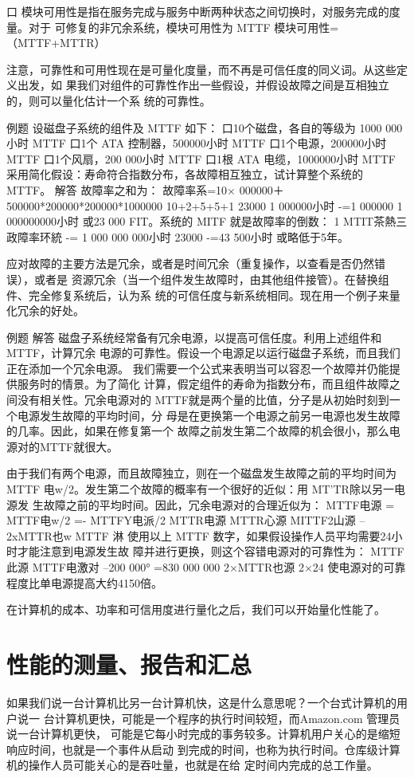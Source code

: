口 模块可用性是指在服务完成与服务中断两种状态之间切换时，对服务完成的度量。对于
可修复的非冗余系统，模块可用性为
MTTF
模块可用性=（MTTF+MTTR）

注意，可靠性和可用性现在是可量化度量，而不再是可信任度的同义词。从这些定义出发，如
果我们对组件的可靠性作出一些假设，并假设故障之间是互相独立的，则可以量化估计一个系
统的可靠性。

例题
设磁盘子系统的组件及 MTTF 如下：
口10个磁盘，各自的等级为 1000 000小时 MTTF
口1个 ATA 控制器，500000小时 MTTF
口1个电源，200000小时 MTTF
口1个风扇，200 000小时 MTTF
口1根 ATA 电缆，1000000小时 MTTF
采用简化假设：寿命符合指数分布，各故障相互独立，试计算整个系统的 MTTF。
解答
故障率之和为：
故障率系=10× 000000＋
500000*200000*200000*1000000
10+2+5+5+1
23000
1 000000小时
-=1 000000 1 000000000小时
或23 000 FIT。系统的 MITF 就是故障率的倒数：
1
MTIT茶熱三政障率环統
-=
1 000 000 000小时
23000
-=43 500小时
或略低于5年。

应对故障的主要方法是冗余，或者是时间冗余（重复操作，以查看是否仍然错误），或者是
资源冗余（当一个组件发生故障时，由其他组件接管）。在替换组件、完全修复系统后，认为系
统的可信任度与新系统相同。现在用一个例子来量化冗余的好处。

例题
解答
磁盘子系统经常备有冗余电源，以提高可信任度。利用上述组件和 MTTF，计算冗余
电源的可靠性。假设一个电源足以运行磁盘子系统，而且我们正在添加一个冗余电源。
我们需要一个公式来表明当可以容忍一个故障并仍能提供服务时的情景。为了简化
计算，假定组件的寿命为指数分布，而且组件故障之间没有相关性。冗余电源对的
MTTF就是两个量的比值，分子是从初始时刻到一个电源发生故障的平均时间，分
母是在更换第一个电源之前另一电源也发生故障的几率。因此，如果在修复第一个
故障之前发生第二个故障的机会很小，那么电源对的MTTF就很大。

由于我们有两个电源，而且故障独立，则在一个磁盘发生故障之前的平均时间为
MTTF 电w/2。发生第二个故障的概率有一个很好的近似：用 MT'TR除以另一电源发
生故障之前的平均时间。因此，冗余电源对的合理近似为：
MTTF电源 =
MTTF电w/2 =-
MTTFY电派/2
MTTR电源
MTTR心源
MITTF2山源
--2xMTTR也w
MTTF 淋
使用以上 MTTF 数字，如果假设操作人员平均需要24小时才能注意到电源发生故
障并进行更换，则这个容错电源对的可靠性为：
MTTF此源
MTTF电激对
--200 000°
=830 000 000
2×MTTR也源
2×24
使电源对的可靠程度比单电源提高大约4150倍。

在计算机的成本、功率和可信用度进行量化之后，我们可以开始量化性能了。

\section{性能的测量、报告和汇总}
如果我们说一台计算机比另一台计算机快，这是什么意思呢？一个台式计算机的用户说一
台计算机更快，可能是一个程序的执行时间较短，而Amazon.com 管理员说一台计算机更快，
可能是它每小时完成的事务较多。计算机用户关心的是缩短响应时间，也就是一个事件从启动
到完成的时间，也称为执行时间。仓库级计算机的操作人员可能关心的是吞吐量，也就是在给
定时间内完成的总工作量。

